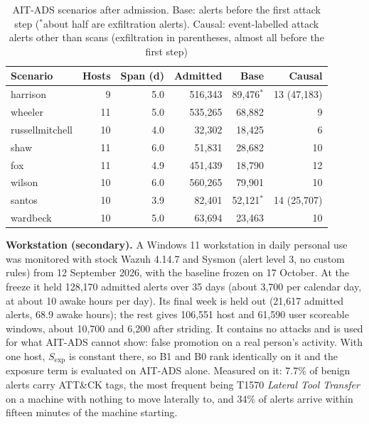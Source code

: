 \documentclass[conference]{IEEEtran}
\begin{document}
\begin{table}[t]
\caption{AIT-ADS scenarios after admission. Base: alerts before the first attack step ($^\ast$about half are exfiltration alerts). Causal: event-labelled attack alerts other than scans (exfiltration in parentheses, almost all before the first step)}
\label{tab:ait}
\centering\footnotesize
\setlength{\tabcolsep}{4.5pt}
\begin{tabular}{@{}lrrrrr@{}}
\toprule
\textbf{Scenario} & \textbf{Hosts} & \textbf{Span (d)} & \textbf{Admitted} & \textbf{Base} & \textbf{Causal} \\
\midrule
harrison & 9 & 5.0 & 516{,}343 & 89{,}476$^\ast$ & 13 (47{,}183) \\
wheeler & 11 & 5.0 & 535{,}265 & 68{,}882 & 9 \\
russellmitchell & 10 & 4.0 & 32{,}302 & 18{,}425 & 6 \\
shaw & 11 & 6.0 & 51{,}831 & 28{,}682 & 10 \\
\midrule
fox & 11 & 4.9 & 451{,}439 & 18{,}790 & 12 \\
wilson & 10 & 6.0 & 560{,}265 & 79{,}901 & 10 \\
santos & 10 & 3.9 & 82{,}401 & 52{,}121$^\ast$ & 14 (25{,}707) \\
wardbeck & 10 & 5.0 & 63{,}694 & 23{,}463 & 10 \\
\bottomrule
\end{tabular}
\end{table}

\textbf{Workstation (secondary).} A Windows 11 workstation in daily personal use was monitored with stock Wazuh 4.14.7 and Sysmon (alert level 3, no custom rules) from 12 September 2026, with the baseline frozen on 17 October. At the freeze it held 128{,}170 admitted alerts over 35 days (about 3{,}700 per calendar day, at about 10 awake hours per day). Its final week is held out (21{,}617 admitted alerts, 68.9 awake hours); the rest gives 106{,}551 host and 61{,}590 user scoreable windows, about 10{,}700 and 6{,}200 after striding. It contains no attacks and is used for what AIT-ADS cannot show: false promotion on a real person's activity. With one host, $S_\mathrm{exp}$ is constant there, so B1 and B0 rank identically on it and the exposure term is evaluated on AIT-ADS alone. Measured on it: 7.7\% of benign alerts carry ATT\&CK tags, the most frequent being T1570 \emph{Lateral Tool Transfer} on a machine with nothing to move laterally to, and 34\% of alerts arrive within fifteen minutes of the machine starting.
\end{document}
